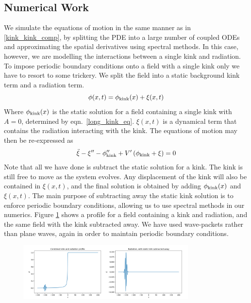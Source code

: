 \documentclass[11pt, oneside]{article}  	%
\numberwithin{equation}{section}
\begin{document}
 \subsection{Numerical Work} \label{kink_rad_numerics}
We simulate the equations of motion in the same manner as in \textsection \ref{kink_kink_comp}, by splitting the PDE into a large number of coupled ODEs and approximating the spatial derivatives using spectral methods. In this case, however, we are modelling the interactions between a single kink and radiation. To impose periodic boundary conditions onto a field with a single kink only we have to resort to some trickery. We split the field into a static background kink term and a radiation term.
\begin{equation}
\phi(x,t) = \phi_{\textup{kink}}(x) + \xi(x,t)
\end{equation}
 Where $\phi_{\textup{kink}}(x)$ is the static solution for a field containing a single kink with $A=0$, determined by eqn.~\ref{long_kink_eq}. $\xi(x,t)$ is a dynamical term that contains the radiation interacting with the kink. The equations of motion may then be re-expressed as
\begin{equation}
\ddot{\xi} - \xi'' - \phi''_\textup{kink} + V' \left( \phi_\textup{kink} + \xi \right)= 0
\end{equation}
Note that all we have done is subtract the static solution for a kink. The kink is still free to move as the system evolves. Any displacement of the kink will also be contained in $\xi(x,t)$, and the final solution is obtained by adding $ \phi_{\textup{kink}}(x)$ and $\xi(x,t)$. The main purpose of subtracting away the static kink solution is to enforce periodic boundary conditions, allowing us to use spectral methods in our numerics. Figure \ref{kink-rad-init} shows a profile for a field containing a kink and radiation, and the same field with the kink subtracted away. We have used wave-packets rather than plane waves, again in order to maintain periodic boundary conditions.\par
\begin{figure}
\centering
\includegraphics[width=0.8\textwidth]{kink_rad_init}
 \label{kink-rad-init}
\end{figure}
\end{document}
